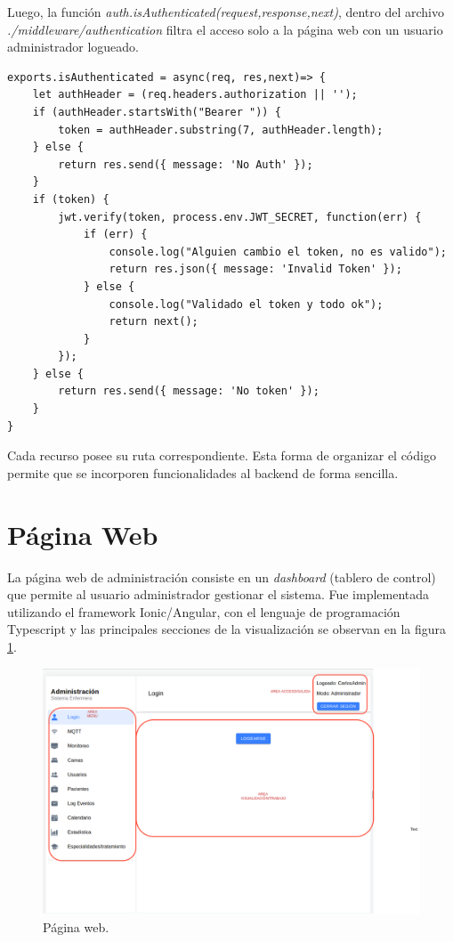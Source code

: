 Luego, la función \textit{auth.isAuthenticated(request,response,next)}, dentro del archivo \textit{./middleware/authentication} filtra el acceso solo a la página web con un usuario administrador logueado.
\begin{lstlisting}[label=cod: Autorización,caption=  Control de token]
exports.isAuthenticated = async(req, res,next)=> {
    let authHeader = (req.headers.authorization || '');
    if (authHeader.startsWith("Bearer ")) {
        token = authHeader.substring(7, authHeader.length);
    } else {
        return res.send({ message: 'No Auth' });
    }
    if (token) {
        jwt.verify(token, process.env.JWT_SECRET, function(err) {
            if (err) {
                console.log("Alguien cambio el token, no es valido");
                return res.json({ message: 'Invalid Token' });
            } else {
                console.log("Validado el token y todo ok");
                return next();
            }
        });
    } else {
        return res.send({ message: 'No token' });
    }
}
\end{lstlisting}

Cada recurso posee su ruta correspondiente. Esta forma de organizar el código permite que se incorporen funcionalidades al backend de forma sencilla.

\pagebreak

\section{Página Web}

La página web de administración consiste en un \textit{dashboard} (tablero de control) que permite al usuario administrador gestionar el sistema.
Fue implementada utilizando el framework Ionic/Angular, con el lenguaje de programación Typescript y las principales secciones de la visualización se observan en la figura \ref{fig:Página web}.

\begin{figure}[ht]
	\centering
	\includegraphics[scale=.40]{./Figures/pagina-web.png}
	\caption{Página web.}
	\label{fig:Página web}
\end{figure}


